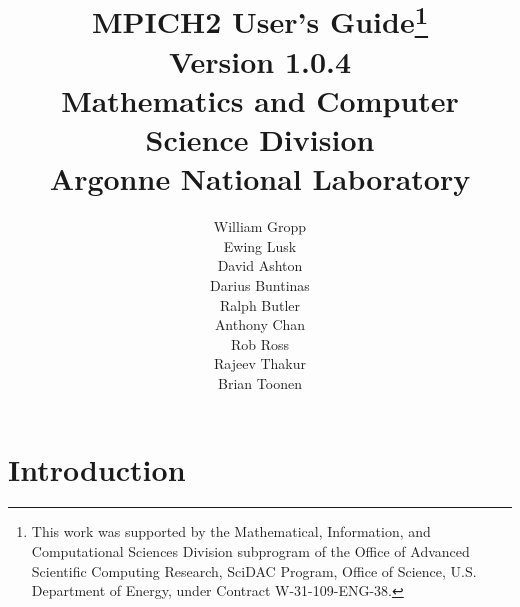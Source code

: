 \documentclass[dvipdfm,11pt]{article}
\begin{document}
\title{\textbf{MPICH2 User's Guide}\thanks{This work was supported by the Mathematical,
    Information, and Computational Sciences Division subprogram of the
    Office of Advanced Scientific Computing Research, SciDAC Program,
    Office of Science, U.S. Department of Energy, under Contract
    W-31-109-ENG-38.}\\
Version 1.0.4\\
Mathematics and Computer Science Division\\
Argonne National Laboratory}

\author{William Gropp\\
Ewing Lusk\\
David Ashton\\
Darius Buntinas\\
Ralph Butler\\
Anthony Chan\\
Rob Ross\\
Rajeev Thakur\\
Brian Toonen}

\maketitle

\cleardoublepage

\tableofcontents
\clearpage

\pagestyle{headings}




\section{Introduction}
\label{sec:introduction}
\end{document}
